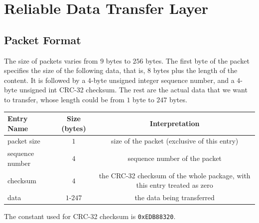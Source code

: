 \documentclass[10pt,a4paper]{article}
\begin{document}
\section{Reliable Data Transfer Layer}
\subsection{Packet Format}
    The size of packets varies from $9$ bytes to $256$ bytes. The first byte of the packet specifies the size of the following data, that is, $8$ bytes plus the length of the content. It is followed by a $4$-byte unsigned integer sequence number, and a $4$-byte unsigned int CRC-32 checksum. The rest are the actual data that we want to transfer, whose length could be from $1$ byte to $247$ bytes.

\begin{center}
    \begin{adjustwidth}{-.7cm}{2cm} %
        \begin{tabular}{lcc}
            Entry Name & Size (bytes) & Interpretation \\%
                \hline
            packet size & $1$ &  size of the packet (exclusive of this entry)\\ 
            sequence number & $4$ & sequence number of the packet\\
            checksum & $4$ & the CRC-32 checksum of the whole package, with this entry treated as zero\\
            data & $1$-$247$ & the data being transferred\\
        \end{tabular}
    \end{adjustwidth}
\end{center}

The constant used for CRC-32 checksum is \texttt{0xEDB88320}.
\end{document}
